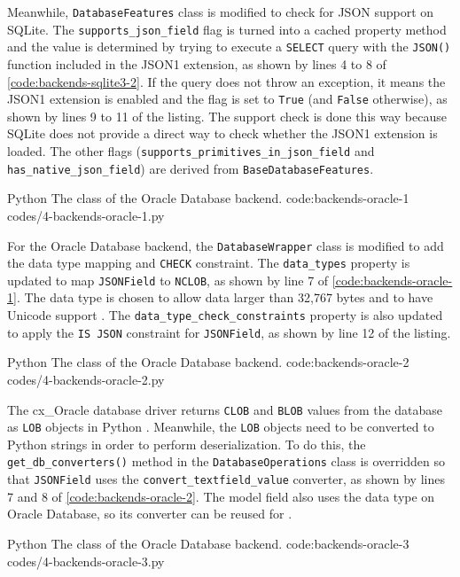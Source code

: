 Meanwhile, \verb|DatabaseFeatures| class is modified to check for JSON support
on SQLite. The \verb|supports_json_field| flag is turned into a cached property
method and the value is determined by trying to execute a \verb|SELECT| query
with the \verb|JSON()| function included in the JSON1 extension, as shown by
lines 4 to 8 of \autoref{code:backends-sqlite3-2}. If the query does not throw
an exception, it means the JSON1 extension is enabled and the flag is set to
\verb|True| (and \verb|False| otherwise), as shown by lines 9 to 11 of the
listing. The support check is done this way because SQLite does not provide a
direct way to check whether the JSON1 extension is loaded. The other flags
(\verb|supports_primitives_in_json_field| and \verb|has_native_json_field|)
are derived from \verb|BaseDatabaseFeatures|.

\listing
{Python}
{The  class of the Oracle Database backend.}
{code:backends-oracle-1}
{codes/4-backends-oracle-1.py}

For the Oracle Database backend, the \verb|DatabaseWrapper| class is modified
to add the data type mapping and \verb|CHECK| constraint. The \verb|data_types|
property is updated to map \verb|JSONField| to \verb|NCLOB|, as shown by line 7
of \autoref{code:backends-oracle-1}. The  data type is chosen to
allow data larger than 32,767 bytes and to have Unicode support
\cite{oracle:overview-json, oracle:database-concepts}. The
\verb|data_type_check_constraints| property is also updated to apply the
\verb|IS JSON| constraint for \verb|JSONField|, as shown by line 12 of the
listing.

\listing
{Python}
{The  class of the Oracle Database backend.}
{code:backends-oracle-2}
{codes/4-backends-oracle-2.py}

The cx\_Oracle database driver returns \verb|CLOB| and \verb|BLOB| values from
the database as \verb|LOB| objects in Python \cite{cxoracle:lob}. Meanwhile,
the \verb|LOB| objects need to be converted to Python strings in order to
perform deserialization. To do this, the \verb|get_db_converters()| method in
the \verb|DatabaseOperations| class is overridden so that \verb|JSONField| uses
the \verb|convert_textfield_value| converter, as shown by lines 7 and 8 of
\autoref{code:backends-oracle-2}. The  model field also uses
the  data type on Oracle Database, so its converter can be reused
for .

\listing
{Python}
{The  class of the Oracle Database backend.}
{code:backends-oracle-3}
{codes/4-backends-oracle-3.py}

